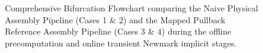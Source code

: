 \begin{figure}[p]
{%
    }
    \caption{Comprehensive Bifurcation Flowchart comparing the Naive Physical Assembly Pipeline (Cases 1 \& 2) and the Mapped Pullback Reference Assembly Pipeline (Cases 3 \& 4) during the offline precomputation and online transient Newmark implicit stages.}
    \label{fig:bifurcation_flowchart}
\end{figure}

